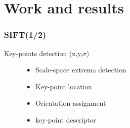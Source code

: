 \documentclass[xcolor=table]{beamer}
\begin{document}


\section{Work and results}
\begin{frame} \frametitle{SIFT(1/2)}


Key-points detection (x,y,$\sigma$)


\begin{figure}[htbp]
    \begin{minipage}[c]{.45\linewidth}
      \begin{itemize}

    \item Scale-space extrema detection\\


    \item  Key-point location\\


    \item Orientation assignment\\


    \item key-point descriptor


\end{itemize}
\end{minipage}
\end{figure}
\end{frame}
\end{document}
